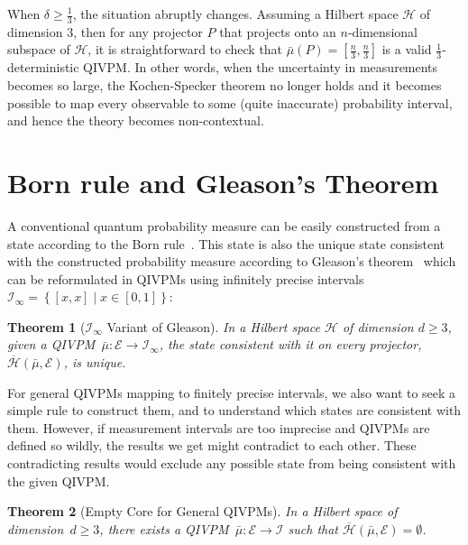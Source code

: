 \documentclass[english,reprint, aps, prl,superscriptaddress, showpacs,
showkeys, longbibliography, amsmath, amssymb, floatfix]{revtex4-1}
\theoremstyle{plain}
\newtheorem{thm}{Theorem}
\theoremstyle{definition}
\newcommand{\Hilb}{\mathcal{H}}
\newcommand{\events}{\ensuremath{\mathcal{E}}}
\newcommand{\set}[2]{\ensuremath{\left\{ {#1}\mathrel{}\middle|\mathrel{}{#2}\right\} }}
\newcommand{\coreBorn}{\ensuremath{\overline{\Hilb}}}
\begin{document}
When $\delta \ge \frac{1}{3}$, the situation abruptly
changes. Assuming a Hilbert space $\Hilb$ of dimension $3$, then for
any projector $P$ that projects onto an $n$-dimensional subspace of
$\Hilb$, it is straightforward to check that
$\bar{\mu}\left(P\right)=\left[\frac{n}{3},\frac{n}{3}\right]$ is a valid
$\frac{1}{3}$-deterministic QIVPM. In other words, when the
uncertainty in measurements becomes so large, the Kochen-Specker
theorem no longer holds and it becomes possible to map every
observable to some (quite inaccurate) probability interval, and hence
the theory becomes non-contextual.


\section{Born rule and Gleason's Theorem}

\label{sec:Gleason}

A conventional quantum probability measure can be easily constructed
from a state according to the Born rule~\citep{Born1983,peres1995quantum,544199,Jaeger2007}.
This state is also the unique state consistent with the constructed
probability measure according to Gleason's theorem~\citep{gleason1957,Redhead1987-REDINA,peres1995quantum}
which can be reformulated in QIVPMs using infinitely precise intervals~$\mathscr{I}_{\infty}=\set{\left[x,x\right]}{x\in\left[0,1\right]}$:

\begin{thm}[$\mathscr{I}_{\infty}$ Variant of Gleason]\label{cor:Gleason's}In
a Hilbert space $\Hilb$ of dimension $d\geq3$, given a QIVPM~$\bar{\mu}:\events\rightarrow\mathscr{I}_{\infty}$,
the state consistent with it on every projector, $\coreBorn\left(\bar{\mu},\events\right)$,
is unique. \end{thm}

\noindent For general QIVPMs mapping to finitely precise intervals,
we also want to seek a simple rule to construct them, and to understand
which states are consistent with them. However, if measurement intervals
are too imprecise and QIVPMs are defined so wildly, the results we
get might contradict to each other. These contradicting results would
exclude any possible state from being consistent with the given QIVPM.

\begin{thm}[Empty Core for General QIVPMs]\label{thm:Non-extensible-of-Gleason's}In
a Hilbert space of dimension~$d\ge3$, there exists a QIVPM~$\bar{\mu}:\events\rightarrow\mathscr{I}$
such that $\coreBorn\left(\bar{\mu},\events\right)=\emptyset$.\end{thm}
\end{document}
